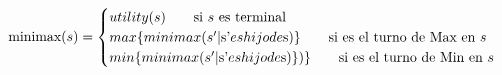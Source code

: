 \documentclass[preview]{standalone}
\begin{document}
\begin{align*}
\text{minimax($s$)} =  \begin{cases}
                                 utility(s) \qquad \text{si $s$ es terminal} \cr
                                 max\{minimax(\text{$s'$}| $s'$ es hijo de $s$)\}\qquad \text{si es el turno de Max en $s$} \cr
                                 min\{minimax(\text{$s'$}| $s'$ es hijo de $s$)\})\}\qquad \text{si es el turno de Min en $s$} \cr
                                 \end{cases}
\end{align*}
\end{document}
